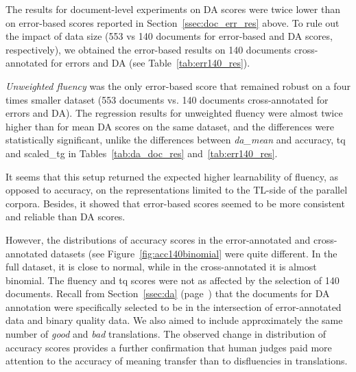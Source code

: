 The results for document-level experiments on DA scores were twice lower than on error-based scores reported in Section~\ref{ssec:doc_err_res} above. To rule out the impact of data size (553 vs 140 documents for error-based and DA scores, respectively), we obtained the error-based results on 140 documents cross-annotated for errors and DA (see Table~\ref{tab:err140_res}).

\textit{Unweighted fluency} was the only error-based score that remained robust on a four times smaller dataset (553 documents vs. 140 documents cross-annotated for errors and DA). The regression results for unweighted fluency were almost twice higher than for mean DA scores on the same dataset, and the differences were statistically significant, unlike the differences between \textit{da\_mean} and accuracy, tq and scaled\_tg in Tables~\ref{tab:da_doc_res} and~\ref{tab:err140_res}.

It seems that this setup returned the expected higher learnability of fluency, as opposed to accuracy, on the representations limited to the TL-side of the parallel corpora. Besides, it showed that error-based scores seemed to be more consistent and reliable than DA scores. %
 
However, the distributions of accuracy scores in the error-annotated and cross-annotated datasets (see Figure~\ref{fig:acc140binomial} were quite different. In the full dataset, it is close to normal, while in the cross-annotated it is almost binomial. The fluency and tq scores were not as affected by the selection of 140 documents. Recall from Section~\ref{ssec:da} (page~\pageref{pg:intersection140}) that the documents for DA annotation were specifically selected to be in the intersection of error-annotated data and binary quality data. We also aimed to include approximately the same number of \textit{good} and \textit{bad} translations. The observed change in distribution of accuracy scores provides a further confirmation that human judges paid more attention to the accuracy of meaning transfer than to disfluencies in translations. 

